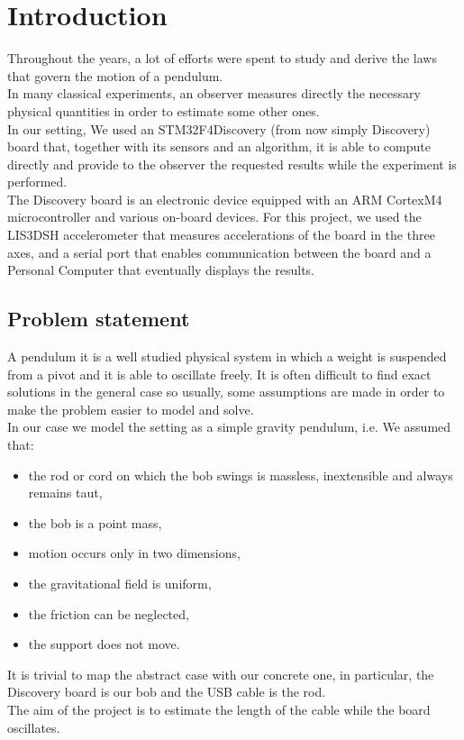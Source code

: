\section{Introduction}
Throughout the years, a lot of efforts were spent to study and derive the laws that govern the motion of a pendulum. \\
In many classical experiments, an observer measures directly the necessary physical quantities in order to estimate some other ones. \\
In our setting, We used an STM32F4Discovery (from now simply Discovery) board that, together with its sensors and an algorithm, it is able to compute directly and provide to the observer the requested results while the experiment is performed. \\
The Discovery board is an electronic device equipped with an ARM CortexM4 microcontroller and various on-board devices. For this project, we used the LIS3DSH accelerometer that measures accelerations of the board in the three axes, and a serial port that enables communication between the board and a Personal Computer that eventually displays the results. \\

\subsection{Problem statement}
A pendulum it is a well studied physical system in which a weight is suspended from a pivot and it is able to oscillate freely. It is often difficult to find exact solutions in the general case so usually, some assumptions are made in order to make the problem easier to model and solve. \\
In our case we model the setting as a simple gravity pendulum, i.e. We assumed that:
\begin{itemize}
	\item the rod or cord on which the bob swings is massless, inextensible and always remains taut,
	\item the bob is a point mass,
	\item motion occurs only in two dimensions,
	\item the gravitational field is uniform,
	\item the friction can be neglected,
	\item the support does not move.
\end{itemize}
It is trivial to map the abstract case with our concrete one, in particular, the Discovery board is our bob and the USB cable is the rod. \\
The aim of the project is to estimate the length of the cable while the board oscillates.

